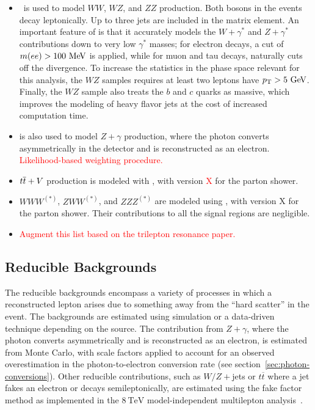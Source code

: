 \begin{itemize}
	\item \sherpa\ is used to model $WW$, $WZ$, and $ZZ$ production. Both bosons in the events decay leptonically. Up to three jets are included in the matrix element. An important feature of \sherpa is that it accurately models the $W+\gamma^{*}$ and $Z+\gamma^{*}$ contributions down to very low $\gamma^{*}$ masses; for electron decays, a cut of $m(ee)>100 \MeV$ is applied, while for muon and tau decays, \sherpa naturally cuts off the divergence. To increase the statistics in the phase space relevant for this analysis, the $WZ$ samples requires at least two leptons have $\pt>5 \GeV$. Finally, the $WZ$ sample also treats the $b$ and $c$ quarks as massive, which improves the modeling of heavy flavor jets at the cost of increased computation time. 

	\item \sherpa is also used to model $Z+\gamma$ production, where the photon converts asymmetrically in the detector and is reconstructed as an electron. \textcolor{red}{Likelihood-based weighting procedure.}

	\item $t\overline{t}+V$ production is modeled with \madgraph, with \pythia version \textcolor{red}{X} for the parton shower. 

	\item $WWW^{(*)}$, $ZWW^{(*)}$, and $ZZZ^{(*)}$ are modeled using \madgraph, with \pythia version X for the parton shower. Their contributions to all the signal regions are negligible.

	\item \textcolor{red}{Augment this list based on the trilepton resonance paper.}
\end{itemize}


\subsection{Reducible Backgrounds}\label{sec:model-independent-reducible-backgrounds}
The reducible backgrounds encompass a variety of processes in which a reconstructed lepton arises due to something away from the ``hard scatter'' in the event. The backgrounds are estimated using simulation or a data-driven technique depending on the source. The contribution from $Z+\gamma$, where the photon converts asymmetrically and is reconstructed as an electron, is estimated from Monte Carlo, with scale factors applied to account for an observed overestimation in the photon-to-electron conversion rate (see section~\ref{sec:photon-conversions}). Other reducible contributions, such as $W/Z+$jets or $t\overline{t}$ where a jet fakes an electron or decays semileptonically, are estimated using the fake factor method as implemented in the $8~\mbox{TeV}$ model-independent multilepton analysis~\cite{DeViveiros:1670929}. 

